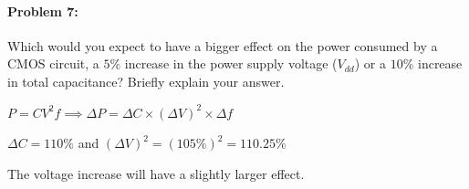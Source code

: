 \documentclass[12pt,letterpaper,titlepage]{article}
\begin{document}
\begin{raggedright}
\paragraph{Problem 7: }
Which would you expect to have a bigger effect on the power consumed by a CMOS circuit, a $5\%$ increase in the power supply voltage ($V_{dd}$) or a $10\%$ increase in total capacitance? Briefly explain your answer.

$P=CV^2f\implies\Delta P = \Delta C\times (\Delta V)^2\times \Delta f$

$\Delta C = 110\%$ and $(\Delta V)^2 = (105\%)^2 = 110.25\%$

The voltage increase will have a slightly larger effect.

\end{raggedright}
\end{document}
